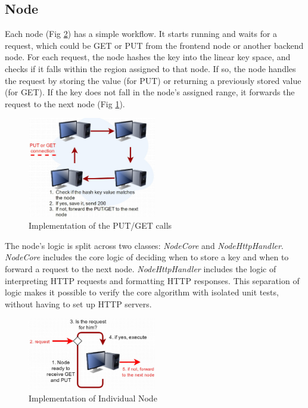\documentclass[11pt,conference]{IEEEtran}
\begin{document}
\subsection{Node}

Each node (Fig \ref{fig:node}) has a simple workflow. It starts running and
waits for a request, which could be GET or PUT from the frontend node or another
backend node. For each request, the node hashes the key into the linear key
space, and checks if it falls within the region assigned to that node. If so,
the node handles the request by storing the value (for PUT) or returning a
previously stored value (for GET). If the key does not fall in the node's
assigned range, it forwards the request to the next node (Fig \ref{fig:putget}).

\begin{figure}[h!]
  \centering
    \includegraphics[width=0.5\textwidth]{putget}
    \caption{Implementation of the PUT/GET calls}
    \label{fig:putget}
\end{figure}

The node's logic is split across two classes: \textit{NodeCore} and
\textit{NodeHttpHandler}. \textit{NodeCore} includes the core logic of deciding
when to store a key and when to forward a request to the next node.
\textit{NodeHttpHandler} includes the logic of interpreting HTTP requests and
formatting HTTP responses. This separation of logic makes it possible to verify
the core algorithm with isolated unit tests, without having to set up HTTP
servers.

\begin{figure}[h!]
  \centering
    \includegraphics[width=0.5\textwidth]{node}
    \caption{Implementation of Individual Node}
    \label{fig:node}
\end{figure}
\end{document}
